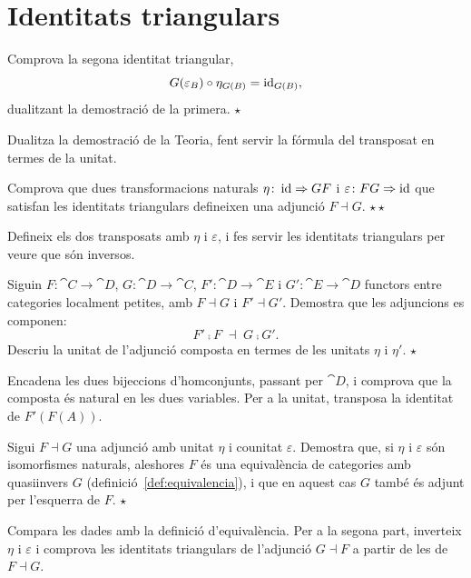 \section{Identitats triangulars}

\begin{exercici}
Comprova la segona identitat triangular,
\[
G(\varepsilon_B)\circ\eta_{G(B)}=\operatorname{id}_{G(B)},
\]
dualitzant la demostració de la primera. \hfill{\normalfont$\star$}
\begin{indicacio}
Dualitza la demostració de la Teoria, fent servir la fórmula del transposat en termes de la unitat.
\end{indicacio}
\end{exercici}

\begin{exercici}\label{exr:adj-triangulars-reciproc}
Comprova que dues transformacions naturals $\eta\colon\operatorname{id}\Rightarrow GF$ i $\varepsilon\colon FG\Rightarrow\operatorname{id}$ que satisfan les identitats triangulars defineixen una adjunció $F\dashv G$. \hfill{\normalfont$\star\star$}
\begin{indicacio}
Defineix els dos transposats amb $\eta$ i $\varepsilon$, i fes servir les identitats triangulars per veure que són inversos.
\end{indicacio}
\end{exercici}

\begin{exercici}
Siguin $F\colon\cat{C}\to\cat{D}$, $G\colon\cat{D}\to\cat{C}$, $F'\colon\cat{D}\to\cat{E}$ i $G'\colon\cat{E}\to\cat{D}$ functors entre categories localment petites, amb $F\dashv G$ i $F'\dashv G'$. Demostra que les adjuncions es componen:
\[
F'\comp F\;\dashv\;G\comp G'.
\]
Descriu la unitat de l'adjunció composta en termes de les unitats $\eta$ i $\eta'$. \hfill{\normalfont$\star$}
\begin{indicacio}
Encadena les dues bijeccions d'homconjunts, passant per $\cat{D}$, i comprova que la composta és natural en les dues variables. Per a la unitat, transposa la identitat de $F'(F(A))$.
\end{indicacio}
\end{exercici}

\begin{exercici}
Sigui $F\dashv G$ una adjunció amb unitat $\eta$ i counitat $\varepsilon$. Demostra que, si $\eta$ i $\varepsilon$ són isomorfismes naturals, aleshores $F$ és una equivalència de categories amb quasiinvers $G$ (definició~\ref{def:equivalencia}), i que en aquest cas $G$ també és adjunt per l'esquerra de $F$. \hfill{\normalfont$\star$}
\begin{indicacio}
Compara les dades amb la definició d'equivalència. Per a la segona part, inverteix $\eta$ i $\varepsilon$ i comprova les identitats triangulars de l'adjunció $G\dashv F$ a partir de les de $F\dashv G$.
\end{indicacio}
\end{exercici}


